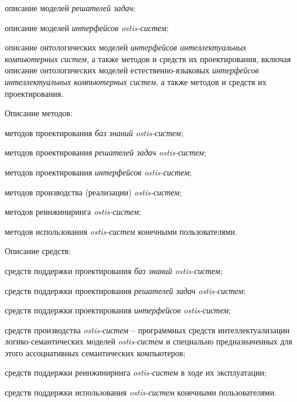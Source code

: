 \begin{SCn}
{\begin{scnitemize}
\begin{scnitemizeii}
\begin{scnitemizeiii}
					\item описание моделей \textit{решателей задач};
					\item описание моделей \textit{интерфейсов ostis-систем};
					\item описание онтологических моделей \textit{интерфейсов
						интеллектуальных компьютерных систем}, а также методов и средств их
					проектирования, включая описание онтологических моделей естественно-языковых
					\textit{интерфейсов интеллектуальных компьютерных систем}, а также методов и
					средств их проектирования.
				\end{scnitemizeiii}
				\item Описание методов:
				\begin{scnitemizeiii}
					\item методов проектирования \textit{баз знаний ostis-систем};
					\item методов проектирования \textit{решателей задач ostis-систем};
					\item методов проектирования \textit{интерфейсов ostis-систем};
					\item методов производства (реализации) \textit{ostis-систем};
					\item методов реинжиниринга \textit{ostis-систем};
					\item методов использования \textit{ostis-систем} конечными
					пользователями.
				\end{scnitemizeiii}
				\item Описание средств:
				\begin{scnitemizeiii}
					\item средств поддержки проектирования \textit{баз знаний
						ostis-систем};
					\item средств поддержки проектирования \textit{решателей задач
						ostis-систем};
					\item средств поддержки проектирования \textit{интерфейсов
						ostis-систем};
					\item средств производства \textit{ostis-систем} -- программных средств
					интеллектуализации логико-семантических моделей \textit{ostis-систем} и
					специально предназначенных для этого ассоциативных семантических компьютеров;
					\item средств поддержки реинжиниринга \textit{ostis-систем} в ходе их
					эксплуатации;
					\item средств поддержки использования \textit{ostis-систем} конечными
					пользователями.
				\end{scnitemizeiii}

\end{scnitemizeii}
\end{scnitemize}}
\end{SCn}
